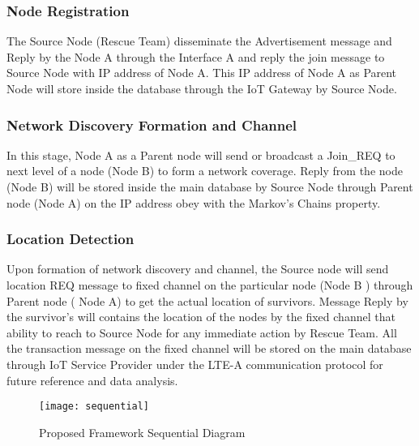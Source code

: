 \documentclass{article}
\begin{document}
\subsubsection{Node Registration}
The Source Node (Rescue Team) disseminate the Advertisement message and Reply by the Node A through the Interface A and reply the join message to Source Node with IP address of Node A. This IP address of Node A as Parent Node will store inside the database through the IoT Gateway by Source Node.

\subsubsection{Network Discovery Formation and Channel }
In this stage, Node A as a Parent node will send or broadcast a Join_REQ to next level of a node (Node B) to form a network coverage. Reply from the node (Node B) will be stored inside the main database by Source Node through Parent node (Node A) on the IP address obey with the Markov’s Chains property.

\subsubsection{Location Detection}
Upon formation of network discovery and channel, the Source node will send location REQ message to fixed channel on the particular node (Node B ) through Parent node ( Node A) to get the actual location of survivors. Message Reply by the survivor's will contains the location of the nodes by the fixed channel that ability to reach to Source Node for any immediate action by Rescue Team. All the transaction message on the fixed channel will be stored on the main database through IoT Service Provider under the LTE-A communication protocol for future reference and data analysis.

\begin{center}
\begin{figure}[t]
\texttt{[image: sequential]}
\caption{Proposed Framework Sequential Diagram}\label{sequential}
\end{figure}
\end{center}
\end{document}
